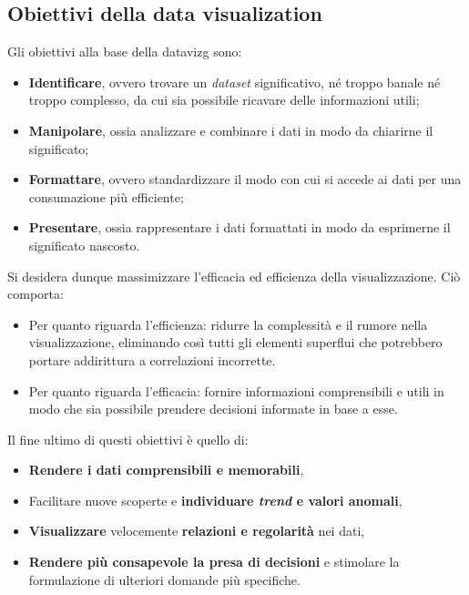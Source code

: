\subsection{Obiettivi della data visualization}
Gli obiettivi alla base della \gls{datavizg} sono:
\begin{itemize}
    \item \textbf{Identificare}, ovvero trovare un \emph{dataset} significativo, né troppo banale né troppo complesso, da cui sia possibile
    ricavare delle informazioni utili;
    \item \textbf{Manipolare}, ossia analizzare e combinare i dati in modo da chiarirne il significato;
    \item \textbf{Formattare}, ovvero standardizzare il modo con cui si accede ai dati per una consumazione più efficiente;
    \item \textbf{Presentare}, ossia rappresentare i dati formattati in modo da esprimerne il significato nascosto.
\end{itemize}
\noindent Si desidera dunque massimizzare l'efficacia ed efficienza della visualizzazione. Ciò comporta:
\begin{itemize}
    \item Per quanto riguarda l'efficienza: ridurre la complessità e il rumore nella visualizzazione, eliminando così tutti gli elementi superflui che potrebbero
    portare addirittura a correlazioni incorrette.
    \item Per quanto riguarda l'efficacia: fornire informazioni comprensibili e utili in modo che sia possibile prendere decisioni informate in base a esse.
\end{itemize}

\bigskip
\noindent Il fine ultimo di questi obiettivi è quello di:
\begin{itemize}
    \item \textbf{Rendere i dati comprensibili e memorabili},
    \item Facilitare nuove scoperte e \textbf{individuare \emph{trend} e valori anomali},
    \item \textbf{Visualizzare} velocemente \textbf{relazioni e regolarità} nei dati,
    \item \textbf{Rendere più consapevole la presa di decisioni} e stimolare la formulazione di ulteriori domande più specifiche.
\end{itemize} 


